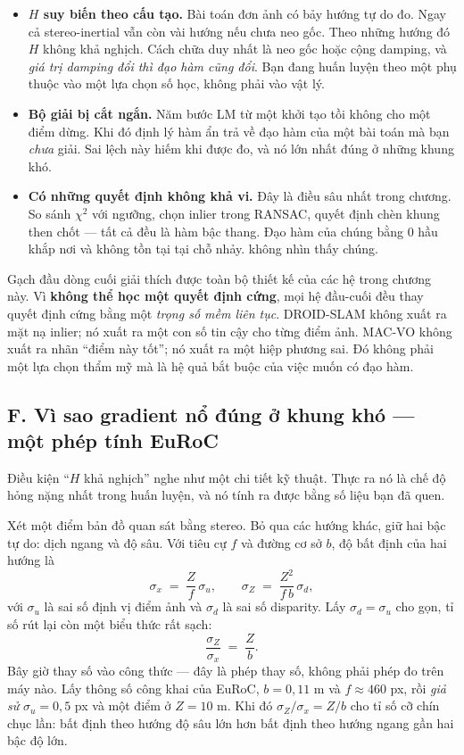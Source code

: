 \documentclass[../../deep_learning.tex]{subfiles}
\begin{document}
\begin{itemize}
\item \textbf{\(H\) suy biến theo cấu tạo.} Bài toán đơn ảnh có bảy hướng tự do đo. Ngay cả stereo-inertial vẫn còn vài hướng nếu chưa neo gốc. Theo những hướng đó \(H\) không khả nghịch. Cách chữa duy nhất là neo gốc hoặc cộng damping, và \emph{giá trị damping đổi thì đạo hàm cũng đổi}. Bạn đang huấn luyện theo một  phụ thuộc vào một lựa chọn số học, không phải vào vật lý.
\item \textbf{Bộ giải bị cắt ngắn.} Năm bước LM từ một khởi tạo tồi không cho một điểm dừng. Khi đó định lý hàm ẩn trả về đạo hàm của một bài toán mà bạn \emph{chưa} giải. Sai lệch này hiếm khi được đo, và nó lớn nhất đúng ở những khung khó.
\item \textbf{Có những quyết định không khả vi.} Đây là điều sâu nhất trong chương. So sánh \(\chi^2\) với ngưỡng, chọn inlier trong RANSAC, quyết định chèn khung then chốt --- tất cả đều là hàm bậc thang. Đạo hàm của chúng bằng 0 hầu khắp nơi và không tồn tại tại chỗ nhảy.  không nhìn thấy chúng.
\end{itemize}

Gạch đầu dòng cuối giải thích được toàn bộ thiết kế của các hệ trong chương này. Vì \textbf{không thể học một quyết định cứng}, mọi hệ đầu-cuối đều thay quyết định cứng bằng một \emph{trọng số mềm liên tục}. DROID-SLAM không xuất ra mặt nạ inlier; nó xuất ra một con số tin cậy cho từng điểm ảnh. MAC-VO không xuất ra nhãn ``điểm này tốt''; nó xuất ra một hiệp phương sai. Đó không phải một lựa chọn thẩm mỹ mà là hệ quả bắt buộc của việc muốn có đạo hàm.


\subsection{F. Vì sao gradient nổ đúng ở khung khó --- một phép tính EuRoC}
Điều kiện ``\(H\) khả nghịch'' nghe như một chi tiết kỹ thuật. Thực ra nó là chế độ hỏng nặng nhất trong huấn luyện, và nó tính ra được bằng số liệu bạn đã quen.

Xét một điểm bản đồ quan sát bằng stereo. Bỏ qua các hướng khác, giữ hai bậc tự do: dịch ngang và độ sâu. Với tiêu cự \(f\) và đường cơ sở \(b\), độ bất định của hai hướng là
\[
\sigma_x \;=\; \frac{Z}{f}\,\sigma_u, \qquad
\sigma_Z \;=\; \frac{Z^2}{f\,b}\,\sigma_d ,
\]
với \(\sigma_u\) là sai số định vị điểm ảnh và \(\sigma_d\) là sai số disparity. Lấy \(\sigma_d = \sigma_u\) cho gọn, tỉ số rút lại còn một biểu thức rất sạch:
\[
\frac{\sigma_Z}{\sigma_x} \;=\; \frac{Z}{b}.
\]
Bây giờ thay số vào công thức --- đây là phép thay số, không phải phép đo trên máy nào. Lấy thông số công khai của EuRoC, \(b = 0{,}11\) m và \(f \approx 460\) px, rồi \emph{giả sử} \(\sigma_u = 0{,}5\) px và một điểm ở \(Z = 10\) m. Khi đó \(\sigma_Z/\sigma_x = Z/b\) cho tỉ số cỡ chín chục lần: bất định theo hướng độ sâu lớn hơn bất định theo hướng ngang gần hai bậc độ lớn.
\end{document}
